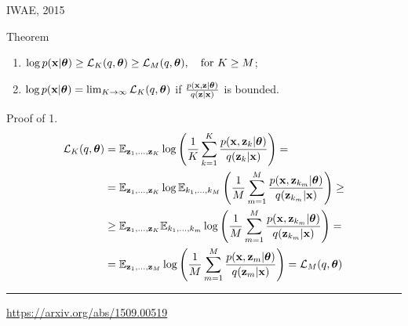 \begin{frame}{IWAE, 2015}
\begin{block}{Theorem}
	\begin{enumerate}
		\item $\log p(\mathbf{x} | \boldsymbol{\theta}) \geq \mathcal{L}_K (q, \boldsymbol{\theta}) \geq \mathcal{L}_M (q, \boldsymbol{\theta}), \quad \text{for } K \geq M$;
		\item $\log p(\mathbf{x} | \boldsymbol{\theta}) = \lim_{K \rightarrow \infty} \mathcal{L}_K (q, \boldsymbol{\theta})$ if $\frac{p(\mathbf{x}, \mathbf{z} | \boldsymbol{\theta})}{q(\mathbf{z} | \mathbf{x})}$ is bounded.
	\end{enumerate}
	\vspace{-0.2cm}
\end{block}
\begin{block}{Proof of 1.}
	{ \footnotesize
		\vspace{-0.5cm}
		\begin{align*}
			\mathcal{L}_K (q, \boldsymbol{\theta}) &= \mathbb{E}_{\mathbf{z}_1, \dots, \mathbf{z}_K} \log \left( \frac{1}{K}\sum_{k=1}^K\frac{p(\mathbf{x}, \mathbf{z}_k | \boldsymbol{\theta})}{q(\mathbf{z}_k| \mathbf{x})} \right) = \\
			&= \mathbb{E}_{\mathbf{z}_1, \dots, \mathbf{z}_K} \log \mathbb{E}_{k_1, \dots, k_M} \left( \frac{1}{M}\sum_{m=1}^M\frac{p(\mathbf{x}, \mathbf{z}_{k_m} | \boldsymbol{\theta})}{q(\mathbf{z}_{k_m}| \mathbf{x})} \right) \geq \\
			&\geq \mathbb{E}_{\mathbf{z}_1, \dots, \mathbf{z}_K} \mathbb{E}_{k_1, \dots, k_m} \log \left( \frac{1}{M}\sum_{m=1}^M\frac{p(\mathbf{x}, \mathbf{z}_{k_m} | \boldsymbol{\theta})}{q(\mathbf{z}_{k_m}| \mathbf{x})} \right) = \\
			&= \mathbb{E}_{\mathbf{z}_1, \dots, \mathbf{z}_M} \log \left( \frac{1}{M}\sum_{m=1}^M\frac{p(\mathbf{x}, \mathbf{z}_m | \boldsymbol{\theta})}{q(\mathbf{z}_m| \mathbf{x})} \right) = \mathcal{L}_M (q, \boldsymbol{\theta})
		\end{align*}
	}
\end{block}

\vfill
\hrule\medskip
{\scriptsize \href{https://arxiv.org/abs/1509.00519}{https://arxiv.org/abs/1509.00519}}
\end{frame}
